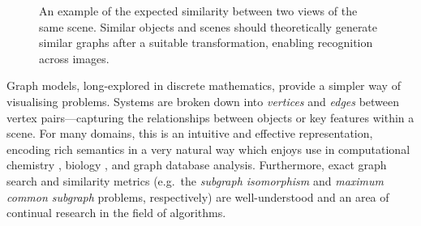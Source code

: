 \documentclass{mpaper}
\begin{document}
\begin{figure}[ht]
{
}
\caption{An example of the expected similarity between two views of the same scene. Similar objects and scenes should theoretically generate similar graphs after a suitable transformation, enabling recognition across images.\label{fig:intro-sim}}
\end{figure}

Graph models, long-explored in discrete mathematics, provide a simpler way of visualising problems.
Systems are broken down into \emph{vertices} and \emph{edges} between vertex pairs---capturing the relationships between objects or key features within a scene.
For many domains, this is an intuitive and effective representation, encoding rich semantics in a very natural way which enjoys use in computational chemistry \cite{Graph-Molecules-2,Graph-Molecules-3,Graph-Molecules-1}, biology \cite{Graph-Biology-1}, and graph database analysis.
Furthermore, exact graph search and similarity metrics (e.g.\ the \emph{subgraph isomorphism} and \emph{maximum common subgraph} problems, respectively) are well-understood and an area of continual research in the field of algorithms.
\end{document}

